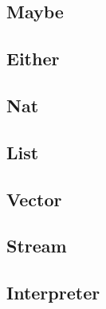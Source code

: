 \documentclass{article}
\begin{document}
\subsection{Maybe}

\subsection{Either}

\subsection{Nat}

\subsection{List}

\subsection{Vector}

\subsection{Stream}

\subsection{Interpreter}
\end{document}
